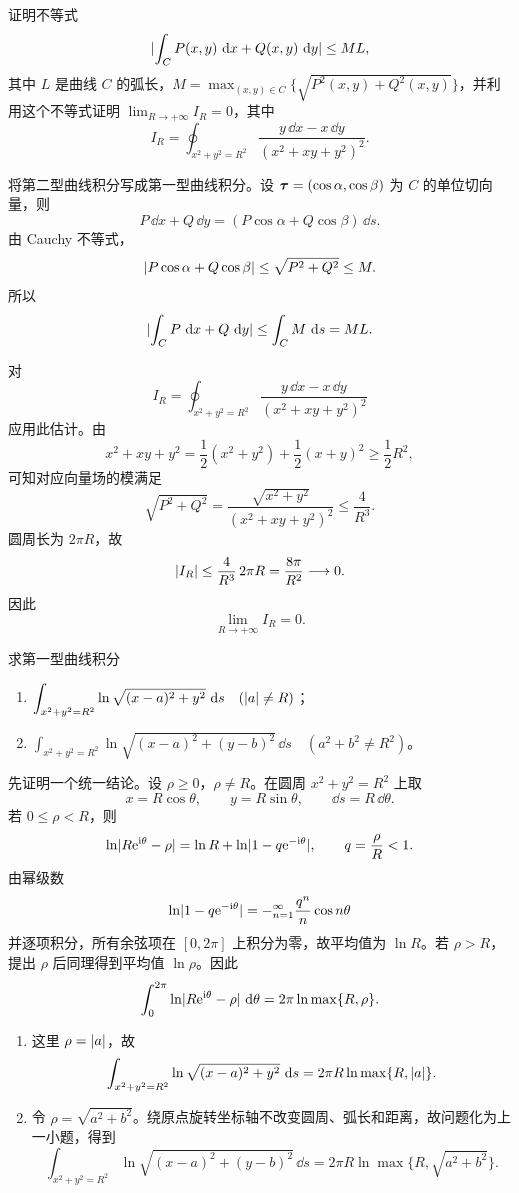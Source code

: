 \begin{xreferenceproblem}[1]
证明不等式
\[
  \lvert\int_CP(x,y)\,\mathop{}\!\mathrm{d} x+Q(x,y)\,\mathop{}\!\mathrm{d} y\rvert\le ML,
\]
其中 $L$ 是曲线 $C$ 的弧长，$M=\max_{(x,y)\in C}\{\sqrt{P^2(x,y)+Q^2(x,y)}\}$，并利用这个不等式证明 $\displaystyle\lim_{R\to+\infty}I_R=0$，其中
\[
  I_R=\oint_{x^2+y^2=R^2}\frac{y\,\dd x-x\,\dd y}{(x^2+xy+y^2)^2}.
\]
\end{xreferenceproblem}
\begin{xsolution}
将第二型曲线积分写成第一型曲线积分。设 $\bm{\tau}=(\cos\alpha,\cos\beta)$ 为 $C$ 的单位切向量，则
\[
  P\,\dd x+Q\,\dd y
  =(P\cos\alpha+Q\cos\beta)\,\dd s.
\]
由 Cauchy 不等式，
\[
  \lvert P\cos\alpha+Q\cos\beta\rvert
  \le\sqrt{P^2+Q^2}\le M.
\]
所以
\[
  \lvert\int_CP\,\mathop{}\!\mathrm{d} x+Q\,\mathop{}\!\mathrm{d} y\rvert
  \le\int_C M\,\mathop{}\!\mathrm{d} s=ML.
\]

对
\[
  I_R=\oint_{x^2+y^2=R^2}
  \frac{y\,\dd x-x\,\dd y}{(x^2+xy+y^2)^2}
\]
应用此估计。由
\[
  x^2+xy+y^2
  =\frac12(x^2+y^2)+\frac12(x+y)^2
  \ge\frac12R^2,
\]
可知对应向量场的模满足
\[
  \sqrt{P^2+Q^2}
  =\frac{\sqrt{x^2+y^2}}{(x^2+xy+y^2)^2}
  \le\frac{4}{R^3}.
\]
圆周长为 $2\pi R$，故
\[
  \lvert I_R\rvert\le\frac4{R^3}\,2\pi R
  =\frac{8\pi}{R^2}\longrightarrow0.
\]
因此
\[
  \lim_{R\to+\infty}I_R=0.
\]
\end{xsolution}
\begin{xreferenceproblem}[2]
求第一型曲线积分
\begin{enumerate}[label=(\arabic*)]
  \item $\displaystyle\int_{x^2+y^2=R^2}\ln\sqrt{(x-a)^2+y^2}\,\mathop{}\!\mathrm{d} s\quad(\lvert a\rvert\ne R)$；
  \item $\displaystyle\int_{x^2+y^2=R^2}\ln\sqrt{(x-a)^2+(y-b)^2}\,\dd s\quad(a^2+b^2\ne R^2)$。
\end{enumerate}
\end{xreferenceproblem}
\begin{xsolution}
先证明一个统一结论。设 $\rho\ge0$，$\rho\ne R$。在圆周 $x^2+y^2=R^2$ 上取
\[
  x=R\cos\theta,\qquad y=R\sin\theta,
  \qquad \dd s=R\,\dd\theta.
\]
若 $0\le\rho<R$，则
\[
  \ln\lvert R\mathrm{e}^{\mathrm{i}\theta}-\rho\rvert
  =\ln R+\ln\lvert1-q\mathrm{e}^{-\mathrm{i}\theta}\rvert,
  \qquad q=\frac\rho R<1.
\]
由幂级数
\[
  \ln\lvert1-q\mathrm{e}^{-\mathrm{i}\theta}\rvert
  =-\relax_{n=1}^{\infty}\frac{q^n}{n}\cos n\theta
\]
并逐项积分，所有余弦项在 $[0,2\pi]$ 上积分为零，故平均值为 $\ln R$。若 $\rho>R$，提出 $\rho$ 后同理得到平均值 $\ln\rho$。因此
\[
  \int_0^{2\pi}\ln\lvert R\mathrm{e}^{\mathrm{i}\theta}-\rho\rvert\,\mathop{}\!\mathrm{d}\theta
  =2\pi\ln\max\{R,\rho\}.
\]

\begin{enumerate}[label=(\arabic*)]
\item 这里 $\rho=\lvert a\rvert$，故
\[
  \int_{x^2+y^2=R^2}
  \ln\sqrt{(x-a)^2+y^2}\,\mathop{}\!\mathrm{d} s
  =2\pi R\ln\max\{R,\lvert a\rvert\}.
\]

\item 令 $\rho=\sqrt{a^2+b^2}$。绕原点旋转坐标轴不改变圆周、弧长和距离，故问题化为上一小题，得到
\[
  \int_{x^2+y^2=R^2}
  \ln\sqrt{(x-a)^2+(y-b)^2}\,\dd s
  =2\pi R\ln\max\{R,\sqrt{a^2+b^2}\}.
\]
\end{enumerate}
\end{xsolution}
